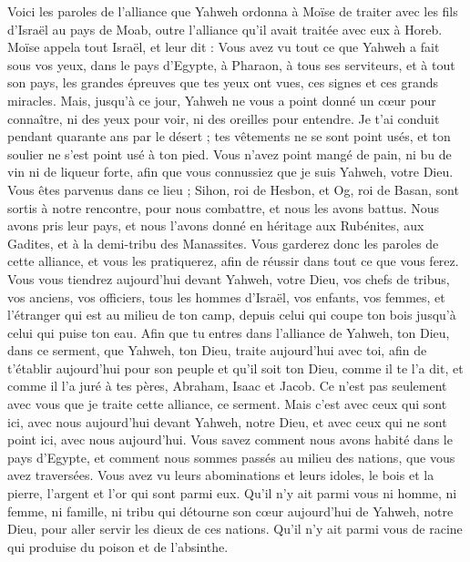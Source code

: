 \begin{multicols}{2}
\VerseOne{}Voici les paroles de l'alliance que Yahweh ordonna à Moïse de traiter avec les fils d'Israël au pays de Moab, outre l'alliance qu'il avait traitée avec eux à Horeb.
Moïse appela tout Israël, et leur dit : Vous avez vu tout ce que Yahweh a fait sous vos yeux, dans le pays d'Egypte, à Pharaon, à tous ses serviteurs, et à tout son pays,
les grandes épreuves que tes yeux ont vues, ces signes et ces grands miracles.
Mais, jusqu'à ce jour, Yahweh ne vous a point donné un cœur pour connaître, ni des yeux pour voir, ni des oreilles pour entendre.
Je t’ai conduit pendant quarante ans par le désert ; tes vêtements ne se sont point usés, et ton soulier ne s’est point usé à ton pied.
Vous n'avez point mangé de pain, ni bu de vin ni de liqueur forte, afin que vous connussiez que je suis Yahweh, votre Dieu.
Vous êtes parvenus dans ce lieu ; Sihon, roi de Hesbon, et Og, roi de Basan, sont sortis à notre rencontre, pour nous combattre, et nous les avons battus.
Nous avons pris leur pays, et nous l'avons donné en héritage aux Rubénites, aux Gadites, et à la demi-tribu des Manassites.
Vous garderez donc les paroles de cette alliance, et vous les pratiquerez, afin de réussir dans tout ce que vous ferez.
Vous vous tiendrez aujourd'hui devant Yahweh, votre Dieu, vos chefs de tribus, vos anciens, vos officiers, tous les hommes d'Israël,
vos enfants, vos femmes, et l’étranger qui est au milieu de ton camp, depuis celui qui coupe ton bois jusqu'à celui qui puise ton eau.
Afin que tu entres dans l'alliance de Yahweh, ton Dieu, dans ce serment, que Yahweh, ton Dieu, traite aujourd'hui avec toi,
afin de t’établir aujourd'hui pour son peuple et qu'il soit ton Dieu, comme il te l’a dit, et comme il l’a juré à tes pères, Abraham, Isaac et Jacob.
Ce n'est pas seulement avec vous que je traite cette alliance, ce serment.
Mais c'est avec ceux qui sont ici, avec nous aujourd'hui devant Yahweh, notre Dieu, et avec ceux qui ne sont point ici, avec nous aujourd'hui.
Vous savez comment nous avons habité dans le pays d'Egypte, et comment nous sommes passés au milieu des nations, que vous avez traversées.
Vous avez vu leurs abominations et leurs idoles, le bois et la pierre, l'argent et l'or qui sont parmi eux.
Qu'il n'y ait parmi vous ni homme, ni femme, ni famille, ni tribu qui détourne son cœur aujourd'hui de Yahweh, notre Dieu, pour aller servir les dieux de ces nations. Qu'il n'y ait parmi vous de racine qui produise du poison et de l'absinthe.

\end{multicols}

